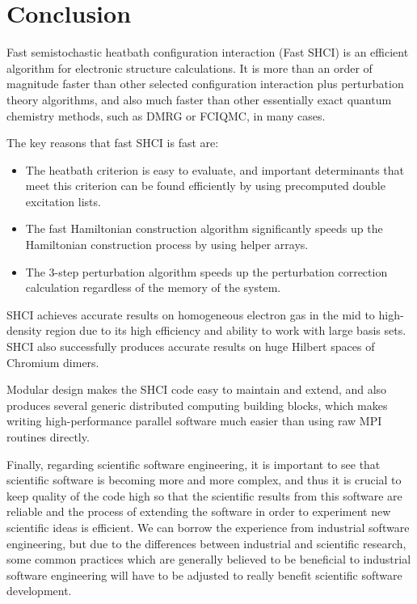 \documentclass[phd,tocprelim]{cornell}
\begin{document}







\chapter{Conclusion}
\label{ch:con}

Fast semistochastic heatbath configuration interaction (Fast SHCI) is an efficient algorithm for electronic structure calculations.
It is more than an order of magnitude faster than other selected configuration interaction plus perturbation theory algorithms, and also much faster than other essentially exact quantum chemistry methods, such as DMRG or FCIQMC, in many cases.

The key reasons that fast SHCI is fast are:
\begin{itemize}
    \item The heatbath criterion is easy to evaluate, and important determinants that meet this criterion can be found efficiently by using precomputed double excitation lists.
    \item The fast Hamiltonian construction algorithm significantly speeds up the Hamiltonian construction process by using helper arrays.
    \item The 3-step perturbation algorithm speeds up the perturbation correction calculation regardless of the memory of the system.
\end{itemize}

SHCI achieves accurate results on homogeneous electron gas in the mid to high-density region due to its high efficiency and ability to work with large basis sets.
SHCI also successfully produces accurate results on huge Hilbert spaces of Chromium dimers.

Modular design makes the SHCI code easy to maintain and extend, and also produces several generic distributed computing building blocks, which makes writing high-performance parallel software much easier than using raw MPI routines directly.

Finally, regarding scientific software engineering, it is important to see that scientific software is becoming more and more complex, and thus it is crucial to keep quality of the code high so that the scientific results from this software are reliable and the process of extending the software in order to experiment new scientific ideas is efficient.
We can borrow the experience from industrial software engineering, but due to the differences between industrial and scientific research, some common practices which are generally believed to be beneficial to industrial software engineering will have to be adjusted to really benefit scientific software development.


\end{document}
